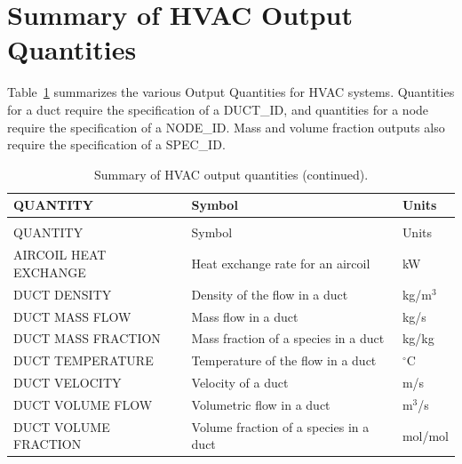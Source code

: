 \documentclass[11pt]{book}
\begin{document}
\clearpage

\section{Summary of HVAC Output Quantities}
\label{info:hvacoutputquantities}

Table~\ref{tab:hvacoutput} summarizes the various Output Quantities for HVAC systems.  Quantities for a duct require the specification
of a {\ct DUCT\_ID}, and quantities for a node require the specification of a {\ct NODE\_ID}.  Mass and volume fraction outputs also require the specification of a {\ct SPEC\_ID}.

\begin{longtable}{|l|l|l|@{\extracolsep{\fill}}}
\caption[HVAC output quantities]{Summary of HVAC output quantities.}
\label{tab:hvacoutput} \\
\hline
{\ct QUANTITY}                                  & Symbol                                    & Units           \\
\hline \hline
\endfirsthead
\caption[]{Summary of HVAC output quantities (continued).} \\
\hline
{\ct QUANTITY}                                  & Symbol                                    & Units           \\
\hline \hline
\endhead
{\ct AIRCOIL HEAT EXCHANGE}                     & Heat exchange rate for an aircoil         &  kW                   \\ \hline
{\ct DUCT DENSITY}                              & Density of the flow in a duct             &  kg/m$^3$             \\ \hline
{\ct DUCT MASS FLOW}                            & Mass flow in a duct                       &  kg/s                 \\ \hline
{\ct DUCT MASS FRACTION}                        & Mass fraction of a species in a duct      &  kg/kg                \\ \hline
{\ct DUCT TEMPERATURE}                          & Temperature of the flow in a duct         & $^\circ$C             \\ \hline
{\ct DUCT VELOCITY}                             & Velocity of a duct                        &  m/s                  \\ \hline
{\ct DUCT VOLUME FLOW}                          & Volumetric flow in a duct                 &  m$^3$/s              \\ \hline
{\ct DUCT VOLUME FRACTION}                      & Volume fraction of a species in a duct    &  mol/mol              \\ \hline

\end{longtable}
\end{document}
